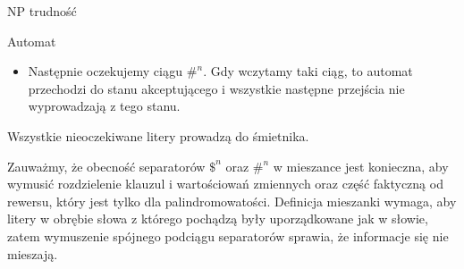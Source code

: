 \documentclass{article}
\theoremstyle{definition}
\theoremstyle{remark}
\begin{document}
\begin{section}{NP trudność}
\begin{subsection}{Automat}
\begin{itemize}
         \item Następnie oczekujemy ciągu $ \#^n$. Gdy wczytamy taki ciąg, to automat
               przechodzi do stanu akceptującego i wszystkie następne przejścia nie
               wyprowadzają z tego stanu.

     \end{itemize}

     Wszystkie nieoczekiwane litery prowadzą do śmietnika.

     Zauważmy, że obecność separatorów $ \$^n $ oraz $ \#^n $ w mieszance jest
     konieczna, aby wymusić rozdzielenie klauzul i wartościowań zmiennych oraz część
     faktyczną od rewersu, który jest tylko dla palindromowatości. Definicja
     mieszanki wymaga, aby litery w obrębie słowa z którego pochądzą były
     uporządkowane jak w słowie, zatem wymuszenie spójnego podciągu separatorów
     sprawia, że informacje się nie mieszają.
 \end{subsection}

\end{section}
\end{document}

